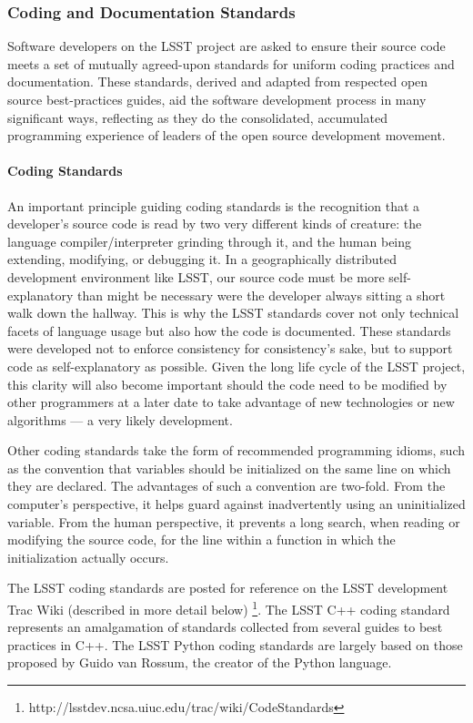\subsubsection{Coding and Documentation Standards}

Software developers on the LSST project are asked to ensure their source code
meets a set of mutually agreed-upon standards for uniform coding practices and
documentation. These standards, derived and adapted from respected open source
best-practices guides, aid the software development process in many significant
ways, reflecting as they do the consolidated, accumulated programming experience
of leaders of the open source development movement.

\paragraph{Coding Standards}

An important principle guiding coding standards is the recognition that a
developer's source code is read by two very different kinds of creature: the
language compiler/interpreter grinding through it, and the human being
extending, modifying, or debugging it. In a geographically distributed
development environment like LSST, our source code must be more self-explanatory
than might be necessary were the developer always sitting a short walk down the
hallway. This is why the LSST standards cover not only technical facets of
language usage but also how the code is documented. These standards were
developed not to enforce consistency for consistency's sake, but to support code
as self-explanatory as possible. Given the long life cycle of the LSST project,
this clarity will also become important should the code need to be modified by
other programmers at a later date to take advantage of new technologies or new
algorithms --- a very likely development.

Other coding standards take the form of recommended programming idioms, such as
the convention that variables should be initialized on the same line on which
they are declared. The advantages of such a convention are two-fold. From the
computer's perspective, it helps guard against inadvertently using an
uninitialized variable. From the human perspective, it prevents a long search,
when reading or modifying the source code, for the line within a function in
which the initialization actually occurs.

The LSST coding standards are posted for reference on the LSST development Trac
Wiki (described in more detail below)%
\footnote{http://lsstdev.ncsa.uiuc.edu/trac/wiki/CodeStandards}. The LSST C++
coding standard represents an amalgamation of standards collected from several
guides to best practices in C++. The LSST Python coding standards are largely
based on those proposed by Guido van Rossum, the creator of the Python language.

